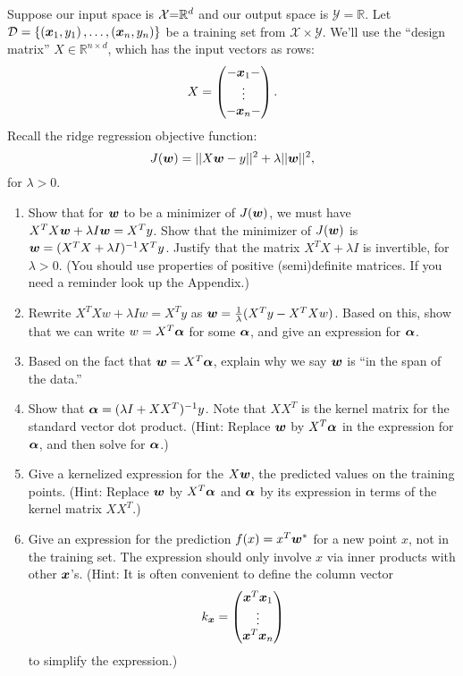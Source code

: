 \documentclass{article}
\theoremstyle{plain}
\theoremstyle{definition}
\begin{document}
Suppose our input space is $\mbox{\ensuremath{\mathcal{X}}=}\mathbb{R}^{d}$ and
our output space is $\mathcal{Y}=\mathbb{R}$. Let $\mathcal{D}=\left\{ \left(\boldsymbol{x}_{1},y_{1}\right),\ldots,\left(\boldsymbol{x}_{n},y_{n}\right)\right\} $
be a training set from $\mathcal{X}\times\mathcal{Y}$. We'll use the ``design matrix''
$X\in\mathbb{R}^{n\times d}$, which has the input vectors as rows: 
\[
X=\begin{pmatrix}-\boldsymbol{x}_{1}-\\
\vdots\\
-\boldsymbol{x}_{n}-
\end{pmatrix}.
\]
Recall the ridge regression objective function:
\[
J(\boldsymbol{w})=||X\boldsymbol{w}-y||^{2}+\lambda||\boldsymbol{w}||^{2},
\]
for $\lambda>0$.
\begin{enumerate}
  \setcounter{enumi}{\value{saveenum}}
\item Show that for $\boldsymbol{w}$ to be a minimizer of $J(\boldsymbol{w})$, we must have $X^{T}X\boldsymbol{w}+\lambda I\boldsymbol{w}=X^{T}y$.
Show that the minimizer of $J(\boldsymbol{w})$ is $\boldsymbol{w}=(X^{T}X+\lambda I)^{-1}X^{T}y$.
Justify that the matrix $X^{T}X+\lambda I$ is invertible, for $\lambda>0$.
(You should use properties of positive (semi)definite matrices. If you need a reminder look up the Appendix.) \\
\item Rewrite $X^{T}Xw+\lambda Iw=X^{T}y$ as $\boldsymbol{w}=\frac{1}{\lambda}(X^{T}y-X^{T}Xw)$.
Based on this, show that we can write $w=X^{T}\boldsymbol{\alpha}$ for some $\boldsymbol{\alpha}$,
and give an expression for $\boldsymbol{\alpha}$.\\
\item Based on the fact that $\boldsymbol{w}=X^{T}\boldsymbol{\alpha}$, explain why we say $\boldsymbol{w}$ is ``in
the span of the data.''\\
\item Show that $\boldsymbol{\alpha}=(\lambda I+XX^{T})^{-1}y$. Note that $XX^{T}$
is the kernel matrix for the standard vector dot product. (Hint: Replace
$\boldsymbol{w}$ by $X^{T}\boldsymbol{\alpha}$ in the expression for $\boldsymbol{\alpha}$, and then solve
for $\boldsymbol{\alpha}$.)\\
\item Give a kernelized expression for the $X\boldsymbol{w}$, the predicted values on
the training points. (Hint: Replace $\boldsymbol{w}$ by $X^{T}\boldsymbol{\alpha}$ and $\boldsymbol{\alpha}$
by its expression in terms of the kernel matrix $XX^{T}$.)\\
\item Give an expression for the prediction $f(x)=x^{T}\boldsymbol{w}^{*}$ for a new
point $x$, not in the training set. The expression should only involve
$x$ via inner products with other $\boldsymbol{x}$'s. (Hint: It is often convenient
to define the column vector
\[
k_{\boldsymbol{x}}=\begin{pmatrix}\boldsymbol{x}^{T}\boldsymbol{x}_{1}\\
\vdots\\
\boldsymbol{x}^{T}\boldsymbol{x}_{n}
\end{pmatrix}
\]
to simplify the expression.) \\
\setcounter{saveenum}{\value{enumi}}
\end{enumerate}
\end{document}
